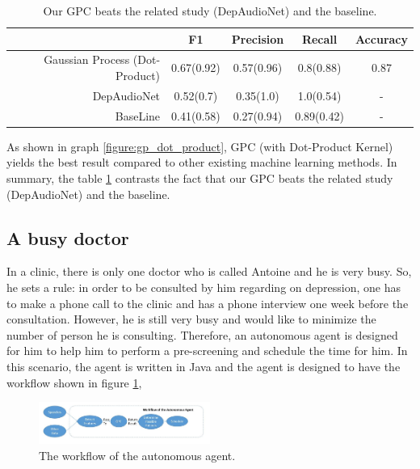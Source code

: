 \documentclass{article}
\begin{document}
        \begin{table}[h!]
		\begin{adjustbox}{width=0.53\textwidth,center}
                \begin{tabular}{ | r | c | c | c | c | }
                 \hline
                                                    & \bfseries F1	& \bfseries Precision 	& \bfseries Recall      & \bfseries Accuracy \\ \hline
                 Gaussian Process (Dot-Product)		& 0.67(0.92) 	& 0.57(0.96)            & 0.8(0.88)			    & 0.87 \\ \hline
                 DepAudioNet	                    & 0.52(0.7) 	& 0.35(1.0)	    		& 1.0(0.54)             & -  \\ \hline
                 BaseLine                       	& 0.41(0.58) 	& 0.27(0.94)			& 0.89(0.42)            & -  \\ \hline
                 \end{tabular}%
       		 \end{adjustbox}
        \caption{Our GPC beats the related study (DepAudioNet) and the baseline.}
        \label{table:comparisionOfGPModelWithOthers}
        \end{table}

        As shown in graph \ref{figure:gp_dot_product}, GPC (with Dot-Product Kernel) yields the best result compared to other existing machine learning methods. 
        In summary, the table \ref{table:comparisionOfGPModelWithOthers} contrasts the fact that our GPC beats the related study (DepAudioNet) and the baseline.

	\subsection{A busy doctor}
	In a clinic, there is only one doctor who is called Antoine and he is very busy. 
	So, he sets a rule: in order to be consulted by him regarding on depression, 
	one has to make a phone call to the clinic and has a phone interview one week before the consultation. 
	However, he is still very busy and would like to minimize the number of person he is consulting. 
	Therefore, an autonomous agent is designed for him to help him to perform a pre-screening and schedule the time for him.
	In this scenario, the agent is written in Java and the agent is designed to have the workflow shown in figure \ref{figure:workflow_agent},

	\begin{figure}[h]
	    \begin{center}
		\includegraphics[width=0.5\textwidth]{workflow_agent}
	    \end{center}
	    \caption{The workflow of the autonomous agent.}
	    \label{figure:workflow_agent}
	\end{figure}
	
\end{document}
